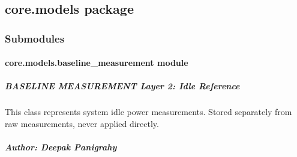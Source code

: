 \documentclass[letterpaper,10pt,english]{sphinxmanual}
\begin{document}
\sphinxstepscope


\subsection{core.models package}
\label{\detokenize{core.models:core-models-package}}\label{\detokenize{core.models::doc}}

\subsubsection{Submodules}
\label{\detokenize{core.models:submodules}}
\sphinxstepscope


\paragraph{core.models.baseline\_measurement module}
\label{\detokenize{core.models.baseline_measurement:module-core.models.baseline_measurement}}\label{\detokenize{core.models.baseline_measurement:core-models-baseline-measurement-module}}\label{\detokenize{core.models.baseline_measurement::doc}}

\subparagraph{BASELINE MEASUREMENT \textendash{} Layer 2: Idle Reference}
\label{\detokenize{core.models.baseline_measurement:baseline-measurement-layer-2-idle-reference}}
\sphinxAtStartPar
This class represents system idle power measurements.
Stored separately from raw measurements, never applied directly.


\subparagraph{Author: Deepak Panigrahy}
\label{\detokenize{core.models.baseline_measurement:author-deepak-panigrahy}}
\end{document}
